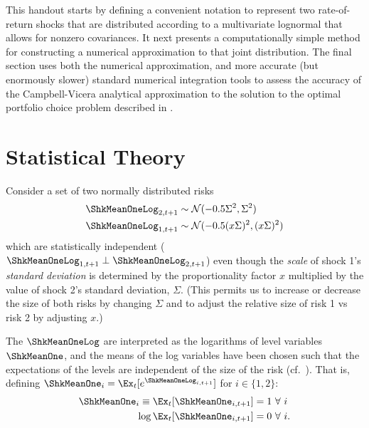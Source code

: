   \newcommand{\sigAll}{\Sigma} %

\newcommand{\scale}{x}

This handout starts by defining a convenient notation to represent two rate-of-return shocks
that are distributed according to a multivariate lognormal that allows
for nonzero covariances.  It next presents a computationally
simple method for constructing a numerical approximation to that joint distribution.  The final
section uses both the numerical approximation, and more accurate (but enormously slower) standard numerical integration tools to assess the accuracy of the Campbell-Vicera analytical approximation to the solution to the optimal portfolio choice problem
described in .

\section{Statistical Theory}

Consider a set of two normally distributed risks
\begin{equation*}\begin{gathered}\begin{aligned}
   \ShkMeanOneLog_{2,t+1} & \sim  \mathcal{N}(-0.5 \sigAll^{2},\sigAll^{2})
\\ \ShkMeanOneLog_{1,t+1} & \sim  \mathcal{N}(-0.5 (\scale \sigAll)^{2},(\scale \sigAll)^{2})
\end{aligned}\end{gathered}\end{equation*}
which are statistically independent ($\ShkMeanOneLog_{1,t+1} \perp \ShkMeanOneLog_{2,t+1}$) even though the {\it scale} of shock 1's
{\it standard deviation} is determined by the proportionality factor
$\scale$ multiplied by the value of shock 2's standard deviation,
$\sigAll$.  (This permits us to increase or decrease the size of both risks
by changing $\sigAll$ and to adjust the relative size of risk 1 vs risk 2 by adjusting $\scale$.)

The $\ShkMeanOneLog$ are interpreted as the logarithms of level variables $\ShkMeanOne$, and the means of the log variables  have been chosen such that the expectations
of the levels are independent of the size of the risk (cf.\ \MathFactsList).  That is, defining $\ShkMeanOne_{i} = \Ex_{t}[e^{\ShkMeanOneLog_{i,t+1}}]$ for $i \in \{1,2\}$:
\begin{equation}\begin{gathered}\begin{aligned}
   \ShkMeanOne_{i} \equiv     \Ex_{t}[\ShkMeanOne_{i,t+1}] & =  1~\forall~i
\\ \log \Ex_{t}[\ShkMeanOne_{i,t+1}] & =  0~\forall~i.
\end{aligned}\end{gathered}\end{equation}

